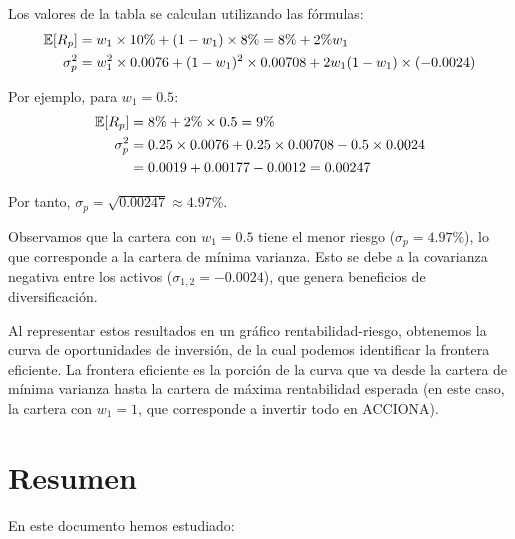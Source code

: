 \begin{ejemplo}
Los valores de la tabla se calculan utilizando las fórmulas:
\begin{align*}
\mathbb{E}[R_p] &= w_1 \times 10\% + (1-w_1) \times 8\% = 8\% + 2\% w_1\\
\sigma_p^2 &= w_1^2 \times 0.0076 + (1-w_1)^2 \times 0.00708 + 2w_1(1-w_1) \times (-0.0024)
\end{align*}

Por ejemplo, para $w_1 = 0.5$:
\begin{align*}
\mathbb{E}[R_p] &= 8\% + 2\% \times 0.5 = 9\%\\
\sigma_p^2 &= 0.25 \times 0.0076 + 0.25 \times 0.00708 - 0.5 \times 0.0024\\
&= 0.0019 + 0.00177 - 0.0012 = 0.00247
\end{align*}

Por tanto, $\sigma_p = \sqrt{0.00247} \approx 4.97\%$.

Observamos que la cartera con $w_1 = 0.5$ tiene el menor riesgo ($\sigma_p = 4.97\%$), lo que corresponde a la cartera de mínima varianza. Esto se debe a la covarianza negativa entre los activos ($\sigma_{1,2} = -0.0024$), que genera beneficios de diversificación.

Al representar estos resultados en un gráfico rentabilidad-riesgo, obtenemos la curva de oportunidades de inversión, de la cual podemos identificar la frontera eficiente. La frontera eficiente es la porción de la curva que va desde la cartera de mínima varianza hasta la cartera de máxima rentabilidad esperada (en este caso, la cartera con $w_1 = 1$, que corresponde a invertir todo en ACCIONA).
\end{ejemplo}

\section{Resumen}

En este documento hemos estudiado:

